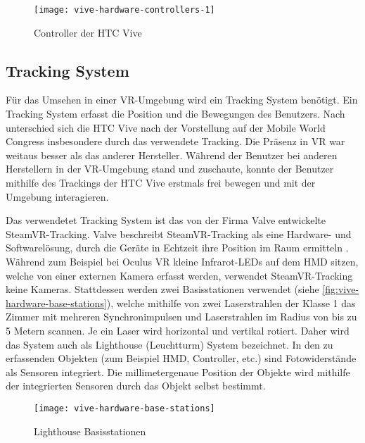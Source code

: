 \begin{figure}[!htbp]
	\centering
	\texttt{[image: vive-hardware-controllers-1]}
	\caption[Controller der HTC Vive]{Controller der HTC Vive \cite{ViveControllers}}
	\label{fig:vive-hardware-controllers-1}
\end{figure}

\subsection{Tracking System}
Für das Umsehen in einer \ac{VR}-Umgebung wird ein Tracking System benötigt. Ein Tracking System erfasst die Position und die Bewegungen des Benutzers. Nach \citeauthor{Sauter.2015} unterschied sich die HTC Vive nach der Vorstellung auf der Mobile World Congress insbesondere durch das verwendete Tracking. Die Präsenz in \ac{VR} war weitaus besser als das anderer Hersteller. Während der Benutzer bei anderen Herstellern in der \ac{VR}-Umgebung stand und zuschaute, konnte der Benutzer mithilfe des Trackings der HTC Vive erstmals frei bewegen und mit der Umgebung interagieren. \cite{Sauter.2015} 

Das verwendetet Tracking System ist das von der Firma Valve entwickelte SteamVR-Tracking. Valve beschreibt SteamVR-Tracking als eine Hardware- und Softwarelösung, durch die Geräte in Echtzeit ihre Position im Raum ermitteln \cite{Valve.2020}. Während zum Beispiel bei Oculus VR kleine Infrarot-LEDs auf dem \ac{HMD} sitzen, welche von einer externen Kamera erfasst werden, verwendet SteamVR-Tracking keine Kameras\cite{Sauter.2015}. Stattdessen werden zwei Basisstationen verwendet (siehe \autoref{fig:vive-hardware-base-stations}), welche mithilfe von zwei Laserstrahlen der Klasse 1 \glqq das Zimmer mit mehreren Synchronimpulsen und Laserstrahlen im Radius von bis zu 5 Metern\grqq \cite{Valve.2020} scannen. Je ein Laser wird horizontal und vertikal rotiert. Daher wird das System auch als Lighthouse (Leuchtturm) System bezeichnet. In den zu erfassenden Objekten (zum Beispiel \ac{HMD}, Controller, etc.) sind Fotowiderstände als Sensoren integriert. Die millimetergenaue Position der Objekte wird mithilfe der integrierten Sensoren durch das Objekt selbst bestimmt. \cite{Yates.20160512}

\begin{figure}[!htbp]
	\centering
	\texttt{[image: vive-hardware-base-stations]}
	\caption[Lighthouse Basisstationen]{Lighthouse Basisstationen \cite{ViveBaseStation}}
	\label{fig:vive-hardware-base-stations}
\end{figure}

